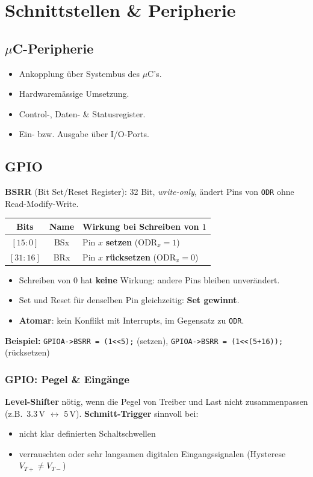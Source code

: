 \section{Schnittstellen \& Peripherie}

\subsection[uC-Peripherie]{$\mu$C-Peripherie}
\begin{itemize}
    \item Ankopplung über Systembus des $\mu$C's.
    \item Hardwaremässige Umsetzung.
    \item Control-, Daten- \& Statusregister.
    \item Ein- bzw. Ausgabe über I/O-Ports.
\end{itemize}

\subsection{GPIO}
\textbf{BSRR} (Bit Set/Reset Register): 32 Bit, \textit{write-only}, ändert Pins von \texttt{ODR} ohne Read-Modify-Write.\vspace{-1.3em}

\begin{center}
\begin{tabular}{|c|c|l|}
\hline
Bits & Name & Wirkung bei Schreiben von $1$ \\
\hline
$[15:0]$ & BSx & Pin $x$ \textbf{setzen} ($\text{ODR}_x=1$) \\
$[31:16]$ & BRx & Pin $x$ \textbf{rücksetzen} ($\text{ODR}_x=0$) \\
\hline
\end{tabular}
\end{center}
\begin{itemize}
    \item Schreiben von $0$ hat \textbf{keine} Wirkung: andere Pins bleiben unverändert.
    \item Set und Reset für denselben Pin gleichzeitig: \textbf{Set gewinnt}.
    \item \textbf{Atomar}: kein Konflikt mit Interrupts, im Gegensatz zu \texttt{ODR}.
\end{itemize}
\textbf{Beispiel:}
\texttt{GPIOA->BSRR = (1<<5);} (setzen), \quad
\texttt{GPIOA->BSRR = (1<<(5+16));} (rücksetzen)

\subsubsection{GPIO: Pegel \& Eingänge}
\textbf{Level-Shifter} nötig, wenn die Pegel von Treiber und Last nicht zusammenpassen (z.B.\ 3.3\,V $\leftrightarrow$ 5\,V).
\textbf{Schmitt-Trigger} sinnvoll bei:
\begin{itemize}
    \item nicht klar definierten Schaltschwellen
    \item verrauschten oder sehr langsamen digitalen Eingangssignalen (Hysterese $V_{T+} \neq V_{T-}$)
\end{itemize}

